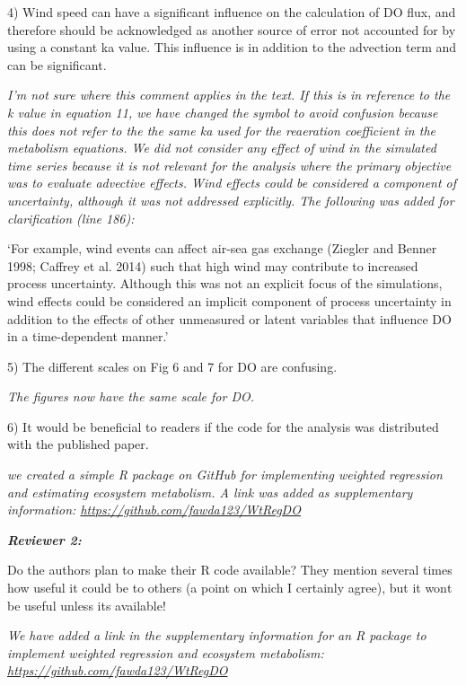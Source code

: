 \documentclass[letterpaper,12pt]{article}\usepackage[]{graphicx}\usepackage[]{color}
\newcommand{\Bigtxt}[1]{\textbf{\textit{#1}}}
\begin{document}
4) Wind speed can have a significant influence on the calculation of DO flux, and therefore should be acknowledged as another source of error not accounted for by using a constant ka value. This influence is in addition to the advection term and can be significant.

{\it I'm not sure where this comment applies in the text.  If this is in reference to the k value in equation 11, we have changed the symbol to avoid confusion because this does not refer to the the same ka used for the reaeration coefficient in the metabolism equations.  We did not consider any effect of wind in the simulated time series because it is not relevant for the analysis where the primary objective was to evaluate advective effects.  Wind effects could be considered a component of uncertainty, although it was not addressed explicitly.  The following was added for clarification (line 186):

`For example, wind events can affect air-sea gas exchange (Ziegler and Benner 1998; Caffrey et al. 2014) such that high wind may contribute to increased process uncertainty.  Although this was not an explicit focus of the simulations, wind effects could be considered an implicit component of process uncertainty in addition to the effects of other unmeasured or latent variables that influence DO in a time-dependent manner.'
}

5) The different scales on Fig 6 and 7 for DO are confusing. 

{\it The figures now have the same scale for DO.}

6) It would be beneficial to readers if the code for the analysis was distributed with the published paper.

{\it we created a simple R package on GitHub for implementing weighted regression and estimating ecosystem metabolism. A link was added as supplementary information: \href{https://github.com/fawda123/WtRegDO}{https://github.com/fawda123/WtRegDO}}  

\Bigtxt{Reviewer 2:}

Do the authors plan to make their R code available? They mention several times how useful it could be to others (a point on which I certainly agree), but it wont be useful unless its available!

{\it We have added a link in the supplementary information for an R package to implement weighted regression and ecosystem metabolism: \href{https://github.com/fawda123/WtRegDO}{https://github.com/fawda123/WtRegDO}}
\end{document}
